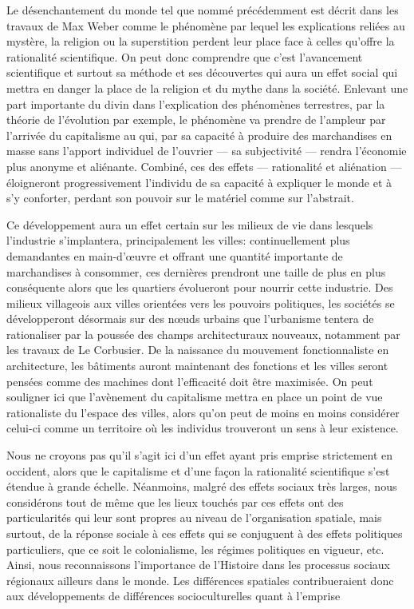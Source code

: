 Le désenchantement du monde tel que nommé précédemment est décrit dans les travaux de Max Weber comme le phénomène par lequel les explications reliées au mystère, la religion ou la superstition perdent leur place face à celles qu'offre la rationalité scientifique. 
On peut donc comprendre que c'est l'avancement scientifique et surtout sa méthode et ses découvertes qui aura un effet social qui mettra en danger la place de la religion et du mythe dans la société. 
Enlevant une part importante du divin dans l'explication des phénomènes terrestres, par la théorie de l'évolution par exemple, le phénomène va prendre de l'ampleur par l'arrivée du capitalisme au  qui, par sa capacité à produire des marchandises en masse sans l'apport individuel de l'ouvrier --- sa subjectivité --- rendra l'économie  plus anonyme et aliénante. 
Combiné, ces des effets --- rationalité et aliénation --- éloigneront progressivement l'individu de sa capacité à expliquer le monde et à s'y conforter, perdant son pouvoir sur le matériel comme sur l'abstrait.

Ce développement aura un effet certain sur les milieux de vie dans lesquels l'industrie s'implantera, principalement les villes: continuellement plus demandantes en main-d’œuvre et offrant une quantité importante de marchandises à consommer, ces dernières prendront une taille de plus en plus conséquente alors que les quartiers évolueront pour nourrir cette industrie. 
Des milieux villageois aux villes orientées vers les pouvoirs politiques, les sociétés se développeront désormais sur des nœuds urbains que l'urbanisme tentera de rationaliser par la poussée des champs architecturaux nouveaux, notamment par les travaux de Le Corbusier. 
De la naissance du mouvement fonctionnaliste en architecture, les bâtiments auront maintenant des fonctions et les villes seront pensées comme des machines dont l'efficacité doit être maximisée\missref{}. 
On peut souligner ici que l'avènement du capitalisme mettra en place un point de vue rationaliste du l'espace des villes, alors qu'on peut de moins en moins considérer celui-ci comme un territoire où les individus trouveront un sens à leur existence.

Nous ne croyons pas qu'il s'agit ici d'un effet ayant pris emprise strictement en occident, alors que le capitalisme et d'une façon la rationalité scientifique s'est étendue à grande échelle. 
Néanmoins, malgré des effets sociaux très larges, nous considérons tout de même que les lieux touchés par ces effets ont des particularités qui leur sont propres au niveau de l'organisation spatiale, mais surtout, de la réponse sociale à ces effets qui se conjuguent à des effets politiques particuliers, que ce soit le colonialisme, les régimes politiques en vigueur, etc. 
Ainsi, nous reconnaissons l'importance de l'Histoire dans les processus sociaux régionaux ailleurs dans le monde. 
Les différences spatiales contribueraient donc aux développements de différences socioculturelles quant à l'emprise 


